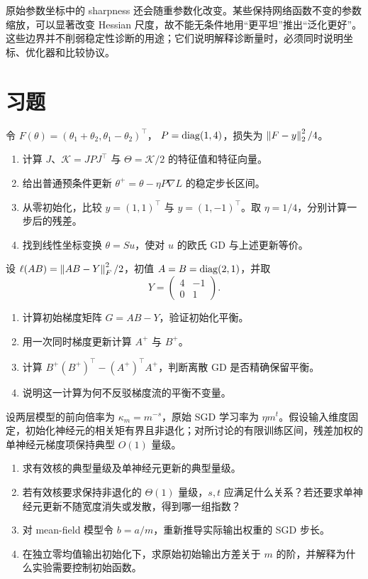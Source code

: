原始参数坐标中的 sharpness 还会随重参数化改变。某些保持网络函数不变的参数缩放，可以显著改变 Hessian 尺度，故不能无条件地用“更平坦”推出“泛化更好”\citep{Dinh2017}。这些边界并不削弱稳定性诊断的用途；它们说明解释诊断量时，必须同时说明坐标、优化器和比较协议。

\section{习题}
\label{l5:exercises}

\begin{exercise}[有效核与目标方向]
令 $F(\theta)=(\theta_1+\theta_2,\theta_1-\theta_2)^\top$，
$P=\operatorname{diag}(1,4)$，损失为 $\left\lVert F-y\right\rVert_2^2/4$。
\begin{enumerate}
 \item 计算 $J$、$\mathcal K=JPJ^\top$ 与 $\Theta=\mathcal K/2$ 的特征值和特征向量。
 \item 给出普通预条件更新 $\theta^+=\theta-\eta P\nabla L$ 的稳定步长区间。
 \item 从零初始化，比较 $y=(1,1)^\top$ 与 $y=(1,-1)^\top$。取 $\eta=1/4$，分别计算一步后的残差。
 \item 找到线性坐标变换 $\theta=Su$，使对 $u$ 的欧氏 GD 与上述更新等价。
\end{enumerate}
\end{exercise}

\begin{exercise}[连续平衡与离散平衡]
设 $\ell(AB)=\left\lVert AB-Y\right\rVert_F^2/2$，初值
$A=B=\operatorname{diag}(2,1)$，并取
\[
 Y=\begin{pmatrix}4&-1\\0&1\end{pmatrix}.
\]
\begin{enumerate}
 \item 计算初始梯度矩阵 $G=AB-Y$，验证初始化平衡。
 \item 用一次同时梯度更新计算 $A^+$ 与 $B^+$。
 \item 计算 $B^+(B^+)^\top-(A^+)^\top A^+$，判断离散 GD 是否精确保留平衡。
 \item 说明这一计算为何不反驳梯度流的平衡不变量。
\end{enumerate}
\end{exercise}

\begin{exercise}[宽度指数与输出坐标]
设两层模型的前向倍率为 $\kappa_m=m^{-s}$，原始 SGD 学习率为
$\eta m^t$。假设输入维度固定，初始化神经元的相关矩有界且非退化；对所讨论的有限训练区间，残差加权的单神经元梯度项保持典型 $O(1)$ 量级。
\begin{enumerate}
 \item 求有效核的典型量级及单神经元更新的典型量级。
 \item 若有效核要求保持非退化的 $\Theta(1)$ 量级，$s,t$ 应满足什么关系？若还要求单神经元更新不随宽度消失或发散，得到哪一组指数？
 \item 对 mean-field 模型令 $b=a/m$，重新推导实际输出权重的 SGD 步长。
 \item 在独立零均值输出初始化下，求原始初始输出方差关于 $m$ 的阶，并解释为什么实验需要控制初始函数。
\end{enumerate}
\end{exercise}

